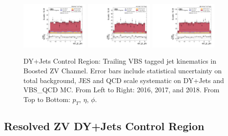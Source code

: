 \begin{figure}[!ht]
  \includegraphics[width=0.30\textwidth]{analysis_plots/2016_zv/cr_vjets_l/vbf_j2_phi.pdf}
  \includegraphics[width=0.30\textwidth]{analysis_plots/2017_zv/cr_vjets_l/vbf_j2_phi.pdf}
  \includegraphics[width=0.30\textwidth]{analysis_plots/2018_zv/cr_vjets_l/vbf_j2_phi.pdf} \\
  \caption[DY+Jets Control Region: Trailing VBS tagged jet kinematics in Boosted ZV Channel]%
  {DY+Jets Control Region: Trailing VBS tagged jet kinematics in Boosted ZV Channel.
    Error bars include statistical uncertainty on total background,
    JES and QCD scale systematic on DY+Jets and VBS\_QCD MC\@. From Left to Right: 2016,
    2017, and 2018. From Top to Bottom: \( p_T \), \( \eta \), \( \phi \).}%
  \label{fig:zv-cr-vjets-l-vbs2-pt-eta-m}
\end{figure}

\clearpage
\subsection{
  Resolved ZV DY+Jets Control Region
}\label{ch_vbs:resolved-plots}

